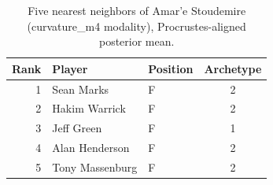 \begin{table}[htbp]
  \centering\small
  \begin{tabular}{rllc}
    \toprule
    Rank & Player & Position & Archetype \\
    \midrule
    1 & Sean Marks & F & 2 \\
    2 & Hakim Warrick & F & 2 \\
    3 & Jeff Green & F & 1 \\
    4 & Alan Henderson & F & 2 \\
    5 & Tony Massenburg & F & 2 \\
    \bottomrule
  \end{tabular}
  \caption{Five nearest neighbors of Amar'e Stoudemire (curvature_m4 modality), Procrustes-aligned posterior mean.}
  \label{tab:Amar_e_Stoudemire_neighbors_curvature_m4}
\end{table}

